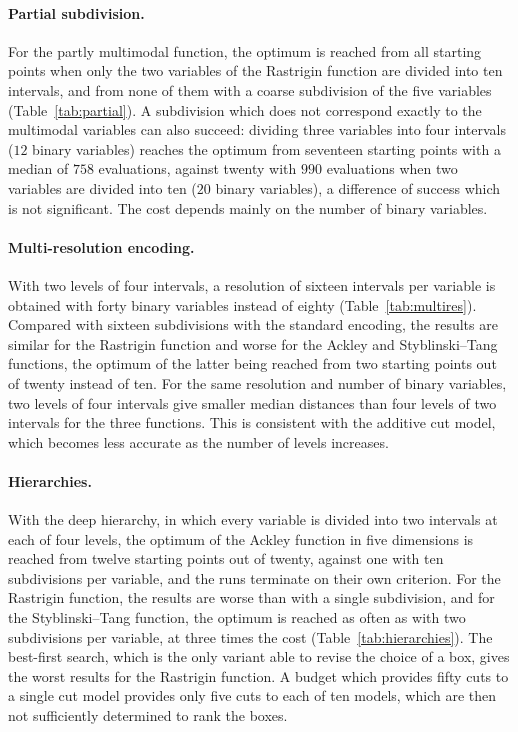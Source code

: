 \documentclass[pdflatex,sn-basic]{sn-jnl}
\newenvironment{appendices}{\appendix}{}
\begin{document}
\begin{appendices}
\paragraph{Partial subdivision.} For the partly multimodal function, the optimum
is reached from all starting points when only the two variables of the Rastrigin
function are divided into ten intervals, and from none of them with a coarse
subdivision of the five variables (Table~\ref{tab:partial}). A subdivision which
does not correspond exactly to the multimodal variables can also succeed:
dividing three variables into four intervals ($12$ binary variables) reaches the
optimum from seventeen starting points with a median of $758$ evaluations,
against twenty with $990$ evaluations when two variables are divided into ten
($20$ binary variables), a difference of success which is not significant. The
cost depends mainly on the number of binary variables.

\paragraph{Multi-resolution encoding.} With two levels of four intervals, a
resolution of sixteen intervals per variable is obtained with forty binary
variables instead of eighty (Table~\ref{tab:multires}). Compared with sixteen
subdivisions with the standard encoding, the results are similar for the
Rastrigin function and worse for the Ackley and Styblinski--Tang functions, the
optimum of the latter being reached from two starting points out of twenty
instead of ten. For the same resolution and number of binary variables, two
levels of four intervals give smaller median distances than four levels of two
intervals for the three functions. This is consistent with the additive cut
model, which becomes less accurate as the number of levels increases.

\paragraph{Hierarchies.} With the deep hierarchy, in which every variable is
divided into two intervals at each of four levels, the optimum of the Ackley
function in five dimensions is reached from twelve starting points out of
twenty, against one with ten subdivisions per variable, and the runs terminate
on their own criterion. For the Rastrigin function, the results are worse than
with a single subdivision, and for the Styblinski--Tang function, the optimum is
reached as often as with two subdivisions per variable, at three times the cost
(Table~\ref{tab:hierarchies}). The best-first search, which is the only variant
able to revise the choice of a box, gives the worst results for the Rastrigin function. A budget which provides fifty
cuts to a single cut model provides only five cuts to each of ten models, which
are then not sufficiently determined to rank the boxes.


\end{appendices}
\end{document}

